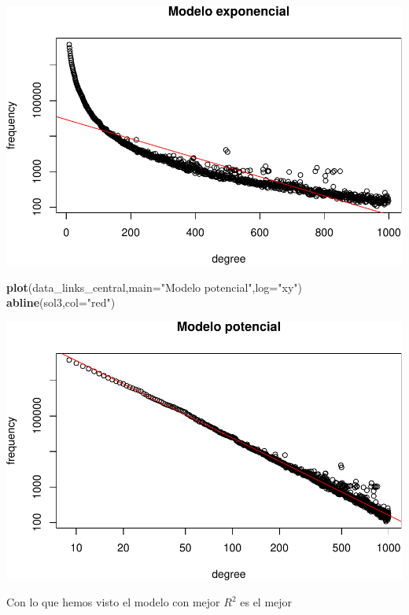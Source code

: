 \documentclass[
]{article}
\newenvironment{Shaded}{\begin{snugshade}}{\end{snugshade}}
\newcommand{\DataTypeTok}[1]{\textcolor[rgb]{0.13,0.29,0.53}{#1}}
\newcommand{\KeywordTok}[1]{\textcolor[rgb]{0.13,0.29,0.53}{\textbf{#1}}}
\newcommand{\NormalTok}[1]{#1}
\newcommand{\OperatorTok}[1]{\textcolor[rgb]{0.81,0.36,0.00}{\textbf{#1}}}
\newcommand{\StringTok}[1]{\textcolor[rgb]{0.31,0.60,0.02}{#1}}
\begin{document}
\includegraphics{taller_problemas_resueltos_extra_1_files/figure-latex/unnamed-chunk-55-2.pdf}

\begin{Shaded}
\begin{Highlighting}[]
\KeywordTok{plot}\NormalTok{(data\_links\_central,}\DataTypeTok{main=}\StringTok{"Modelo potencial"}\NormalTok{,}\DataTypeTok{log=}\StringTok{"xy"}\NormalTok{)}
\KeywordTok{abline}\NormalTok{(sol3,}\DataTypeTok{col=}\StringTok{"red"}\NormalTok{)}
\end{Highlighting}
\end{Shaded}

\includegraphics{taller_problemas_resueltos_extra_1_files/figure-latex/unnamed-chunk-55-3.pdf}

Con lo que hemos visto el modelo con mejor \(R^2\) es el mejor

\begin{Shaded}
\end{Shaded}
\end{document}
